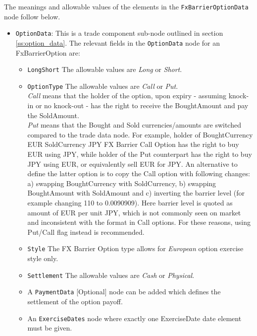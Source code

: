 The meanings and allowable values of the elements in the \lstinline!FxBarrierOptionData!  node follow below.

\begin{itemize}

\item \lstinline!OptionData!: This is a trade component sub-node outlined in section \ref{ss:option_data}. 
The relevant fields in the \lstinline!OptionData! node for an FxBarrierOption are:

\begin{itemize}
\item \lstinline!LongShort! The allowable values are \emph{Long} or \emph{Short}.

\item \lstinline!OptionType! The allowable values are \emph{Call} or \emph{Put}. \\
 \emph{Call} means that the holder of the option, upon expiry - assuming knock-in or no knock-out - has the right to receive the BoughtAmount and pay the SoldAmount. \\\emph{Put} means that the Bought and Sold currencies/amounts are switched compared to the trade data node. 
For example, holder of BoughtCurrency EUR SoldCurrency JPY FX Barrier Call Option has the right to buy EUR using JPY, while
holder of the Put counterpart has the right to buy JPY using EUR, or equivalently sell EUR for JPY. An alternative to define the latter option is to copy the Call option with following changes:\\
a) swapping BoughtCurrency with SoldCurrency, b) swapping BoughtAmount with SoldAmount and c) inverting the barrier level (for example changing 110 to 0.0090909). Here barrier level is
quoted as amount of EUR per unit JPY, which is not commonly seen on market and inconsistent with the format in Call options. For these reasons, using Put/Call flag instead is recommended.

\item  \lstinline!Style! The FX Barrier Option type allows for \emph{European} option exercise style only.

\item  \lstinline!Settlement! The allowable values are \emph{Cash} or \emph{Physical}.

\item A \lstinline!PaymentData! [Optional] node can be added which defines the settlement of the option payoff.

\item An \lstinline!ExerciseDates! node where exactly one ExerciseDate date element must be given.


\end{itemize}
\end{itemize}
